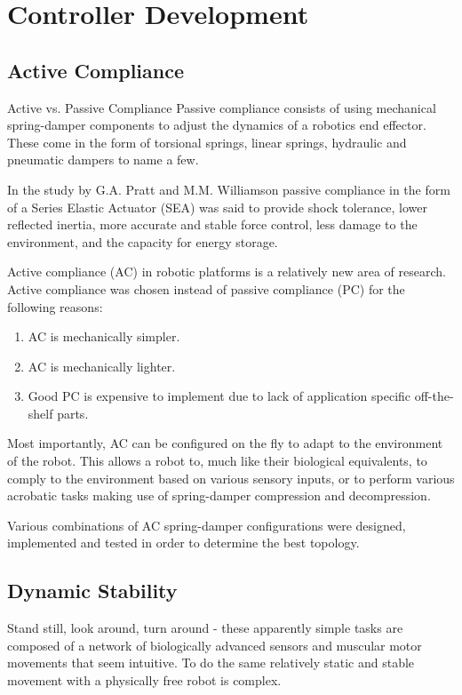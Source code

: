 \chapter{Controller Development}

\section{Active Compliance}
Active vs. Passive Compliance
Passive compliance consists of using mechanical spring-damper components to adjust the dynamics of a robotics end effector. These come in the form of torsional springs, linear springs, hydraulic and pneumatic dampers to name a few. 

In the study by G.A. Pratt and M.M. Williamson  passive compliance in the form of a Series Elastic Actuator (SEA) was said to provide shock tolerance, lower reflected 
inertia, more accurate and stable force control, less damage to the environment, and the capacity for energy storage.\cite{Pratt1995}

Active compliance (AC) in robotic platforms is a relatively new area of research. Active compliance was chosen instead of passive compliance (PC) for the following reasons:

\begin{enumerate}
\item AC is mechanically simpler.
\item AC is mechanically lighter.
\item Good PC is expensive to implement due to lack of application specific off-the-shelf parts.
\end{enumerate}

Most importantly, AC can be configured on the fly to adapt to the environment of the robot. This allows a robot to, much like their biological equivalents, to comply to the environment based on various sensory inputs, or to perform various acrobatic tasks making use of spring-damper compression and decompression.

Various combinations of AC spring-damper configurations were designed, implemented and tested in order to determine the best topology.

\section{Dynamic Stability}
Stand still, look around, turn around - these apparently simple tasks are composed of a network of biologically advanced sensors and muscular motor movements that seem intuitive. To do the same relatively static and stable movement with a physically free robot is complex. 

